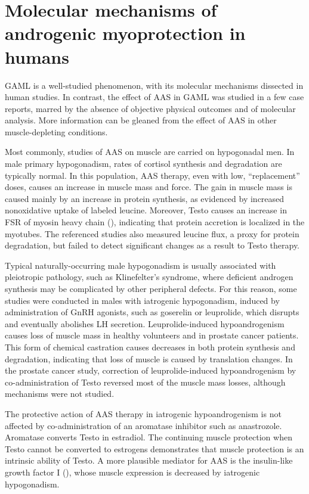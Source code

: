 \documentclass[12pt,english]{report}\usepackage[]{graphicx}\usepackage[]{color}
\begin{document}
\section{Molecular mechanisms of androgenic myoprotection in humans}

GAML is a well-studied phenomenon, with its molecular mechanisms dissected
in human studies. In contrast, the effect of AAS in GAML was studied
in a few case reports, marred by the absence of objective physical
outcomes and of molecular analysis. More information can be gleaned
from the effect of AAS in other muscle-depleting conditions.

Most commonly, studies of AAS on muscle are carried on hypogonadal
men. In male primary hypogonadism, rates of cortisol synthesis and
degradation are typically normal\citep{vierhapper2004production}.
In this population, AAS therapy, even with low, ``replacement''
doses, causes an increase in muscle mass and force\citep{bhasin1997testosterone,brodsky1996effects}.
The gain in muscle mass is caused mainly by an increase in protein
synthesis, as evidenced by increased nonoxidative uptake of labeled
leucine\citep{brodsky1996effects}. Moreover, Testo causes an increase
in FSR of myosin heavy chain (),
indicating that protein accretion is localized in the myotubes. The
referenced studies also measured leucine flux, a proxy for protein
degradation, but failed to detect significant changes as a result
to Testo therapy.

Typical naturally-occurring male hypogonadism is usually associated
with pleiotropic pathology, such as Klinefelter's syndrome, where
deficient androgen synthesis may be complicated by other peripheral
defects. For this reason, some studies were conducted in males with
iatrogenic hypogonadism, induced by administration of GnRH agonists,
such as goserelin or leuprolide, which disrupts and eventually abolishes
LH secretion. Leuprolide-induced hypoandrogenism causes loss of muscle
mass in healthy volunteers and in prostate cancer patients\citep{smith2002changes,boxer2005effect}.
This form of chemical castration causes decreases in both protein
synthesis and degradation\citep{mauras1998testosterone}, indicating
that loss of muscle is caused by translation changes. In the prostate
cancer study, correction of leuprolide-induced hypoandrogenism by
co-administration of Testo reversed most of the muscle mass losses,
although mechanisms were not studied.

The protective action of AAS therapy in iatrogenic hypoandrogenism
is not affected by co-administration of an aromatase inhibitor such
as anastrozole\citep{finkelstein2013gonadal}. Aromatase converts
Testo in estradiol. The continuing muscle protection when Testo cannot
be converted to estrogens demonstrates that muscle protection is an
intrinsic ability of Testo. A more plausible mediator for AAS is the
insulin-like growth factor I (),
whose muscle expression is decreased by iatrogenic hypogonadism\citep{mauras1998testosterone}.
\end{document}
